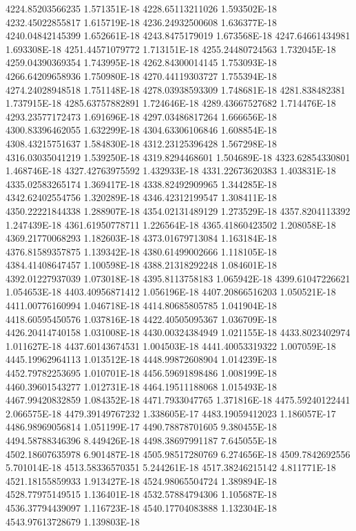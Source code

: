 4224.85203566235  1.571351E-18
4228.65113211026  1.593502E-18
4232.45022855817  1.615719E-18
4236.24932500608  1.636377E-18
4240.04842145399  1.652661E-18
4243.8475179019  1.673568E-18
4247.64661434981  1.693308E-18
4251.44571079772  1.713151E-18
4255.24480724563  1.732045E-18
4259.04390369354  1.743995E-18
4262.84300014145  1.753093E-18
4266.64209658936  1.750980E-18
4270.44119303727  1.755394E-18
4274.24028948518  1.751148E-18
4278.03938593309  1.748681E-18
4281.838482381  1.737915E-18
4285.63757882891  1.724646E-18
4289.43667527682  1.714476E-18
4293.23577172473  1.691696E-18
4297.03486817264  1.666656E-18
4300.83396462055  1.632299E-18
4304.63306106846  1.608854E-18
4308.43215751637  1.584830E-18
4312.23125396428  1.567298E-18
4316.03035041219  1.539250E-18
4319.8294468601  1.504689E-18
4323.62854330801  1.468746E-18
4327.42763975592  1.432933E-18
4331.22673620383  1.403831E-18
4335.02583265174  1.369417E-18
4338.82492909965  1.344285E-18
4342.62402554756  1.320289E-18
4346.42312199547  1.308411E-18
4350.22221844338  1.288907E-18
4354.02131489129  1.273529E-18
4357.8204113392  1.247439E-18
4361.61950778711  1.226564E-18
4365.41860423502  1.208058E-18
4369.21770068293  1.182603E-18
4373.01679713084  1.163184E-18
4376.81589357875  1.139342E-18
4380.61499002666  1.118105E-18
4384.41408647457  1.100598E-18
4388.21318292248  1.084601E-18
4392.01227937039  1.073018E-18
4395.8113758183  1.065942E-18
4399.61047226621  1.054653E-18
4403.40956871412  1.056196E-18
4407.20866516203  1.050521E-18
4411.00776160994  1.046718E-18
4414.80685805785  1.041904E-18
4418.60595450576  1.037816E-18
4422.40505095367  1.036709E-18
4426.20414740158  1.031008E-18
4430.00324384949  1.021155E-18
4433.8023402974  1.011627E-18
4437.60143674531  1.004503E-18
4441.40053319322  1.007059E-18
4445.19962964113  1.013512E-18
4448.99872608904  1.014239E-18
4452.79782253695  1.010701E-18
4456.59691898486  1.008199E-18
4460.39601543277  1.012731E-18
4464.19511188068  1.015493E-18
4467.99420832859  1.084352E-18
4471.7933047765  1.371816E-18
4475.59240122441  2.066575E-18
4479.39149767232  1.338605E-17
4483.19059412023  1.186057E-17
4486.98969056814  1.051199E-17
4490.78878701605  9.380455E-18
4494.58788346396  8.449426E-18
4498.38697991187  7.645055E-18
4502.18607635978  6.901487E-18
4505.98517280769  6.274656E-18
4509.7842692556  5.701014E-18
4513.58336570351  5.244261E-18
4517.38246215142  4.811771E-18
4521.18155859933  1.913427E-18
4524.98065504724  1.389894E-18
4528.77975149515  1.136401E-18
4532.57884794306  1.105687E-18
4536.37794439097  1.116723E-18
4540.17704083888  1.132304E-18
4543.97613728679  1.139803E-18
